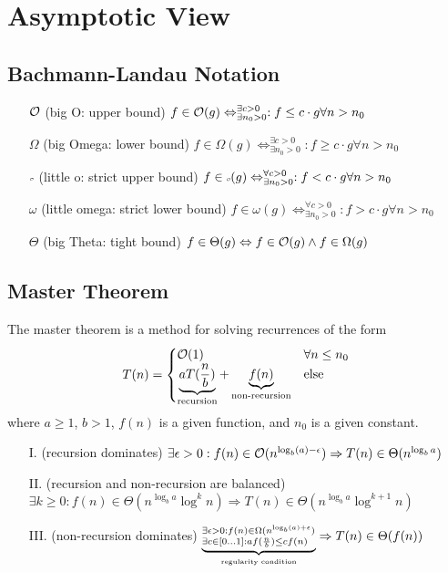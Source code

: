 \documentclass{article}
\author{Leopold Lemmermann}
\begin{document}
\createtitle

\section{Asymptotic View}
\subsection{Bachmann-Landau Notation}
\begin{itemize}
  \item[$\mathcal{O}$] (big O: upper bound) $f\in \mathcal{O}(g) \Leftrightarrow ^{\exists c > 0}_{\exists n_0 > 0}: f \leq c \cdot g \forall n > n_0$
  \item[$\Omega$] (big Omega: lower bound) $f\in \Omega(g) \Leftrightarrow ^{\exists c > 0}_{\exists n_0 > 0}: f \geq c \cdot g \forall n > n_0$
  \item[$\littleO$] (little o: strict upper bound) $f\in \littleO(g) \Leftrightarrow ^{\forall c > 0}_{\exists n_0 > 0}: f < c \cdot g \forall n > n_0$
  \item[$\omega$] (little omega: strict lower bound) $f\in \omega(g) \Leftrightarrow ^{\forall c > 0}_{\exists n_0 > 0}: f > c \cdot g \forall n > n_0$
  \item[$\Theta$] (big Theta: tight bound) $f\in \Theta(g) \Leftrightarrow f\in \mathcal{O}(g) \land f\in \Omega(g)$
\end{itemize}

\subsection{Master Theorem}
The master theorem is a method for solving recurrences of the form
\begin{equation}
  T(n) = \begin{cases}
    \mathcal{O}(1)                                                                                   & \forall n \leq n_0 \\
    \underbrace{aT(\frac{n}{b})}_{\text{recursion}} + \underbrace{f(n)}_{\text{non-recursion}} & \text{else}
  \end{cases}
\end{equation}
where $a \geq 1$, $b > 1$, $f(n)$ is a given function, and $n_0$ is a given constant.

\begin{itemize}
  \item[I.] (recursion dominates) $\exists \epsilon > 0: f(n) \in \mathcal{O}(n^{\log_b(a)-\epsilon}) \Rightarrow T(n) \in \Theta(n^{\log_b a})$
  \item[II.] (recursion and non-recursion are balanced) $\exists k \ge 0: f(n) \in \Theta(n^{\log_b a}\log^k n) \Rightarrow T(n) \in \Theta(n^{\log_b a} \log^{k+1} n)$
  \item[III.] (non-recursion dominates) $\underbrace{^{\exists \epsilon > 0: f(n) \in \Omega(n^{\log_b(a)+\epsilon})}_{\exists c \in [0\dots1]: a f(\frac{n}{b}) \leq c f(n)}}_{\text{\tiny regularity condition}} \Rightarrow T(n) \in \Theta(f(n))$
\end{itemize}
\end{document}
